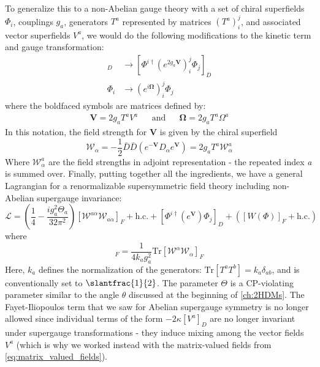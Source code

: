 To generalize this to a non-Abelian gauge theory with a set of chiral superfields $\Phi_i$, couplings $g_a$, generators $T^a$ represented by matrices $(T^a)_i^j$, and associated vector superfields $V^a$, we would do the following modifications to the kinetic term and gauge transformation:
\begin{align*}
  [\Phi^\dagger e^{2gqV}\Phi]_D&\rightarrow[\Phi^{i\dagger} (e^{2g_a\mathbf{V}})_i^j\Phi_j]_D\\
  \Phi_i&\rightarrow (e^{i\textbf{Ω}})_i^j\Phi_j
\end{align*}
where the boldfaced symbols are matrices defined by:
\begin{align}
  \mathbf{V} = 2g_aT^aV^a&&\text{and}&& \textbf{Ω} = 2g_aT^a\Omega^a
  \label{eq:matrix_valued_fields}
\end{align}
In this notation, the field strength for \textbf{V} is given by the chiral superfield
\[\mathcal{W}_\alpha = -\frac{1}{2}\bar{D}\bar{D}\left(e^{-\mathbf{V}}D_\alpha e^{\mathbf{V}}\right) = 2g_aT^a\mathcal{W}^a_\alpha\]
Where $\mathcal{W}_\alpha^a$ are the field strengths in adjoint representation - the repeated index \emph{a} is summed over. Finally, putting together all the ingredients, we have a general Lagrangian for a renormalizable supersymmetric field theory including non-Abelian supergauge invariance:
\begin{equation*}
  \mathcal{L} = \left(\frac{1}{4}-\frac{ig_a^2\Theta_a}{32\pi^2}\right)[\mathcal{W}^{a\alpha}\mathcal{W}_{a\alpha}]_F + \text{h.c.} + \left[\Phi^{i\dagger}(e^{\mathbf{V}})\Phi_j\right]_D + \left([W(\Phi)]_F + \text{h.c.}\right)
\end{equation*}
where 
\begin{equation*}
  [\mathcal{W}^{a\alpha}\mathcal{W}_{a\alpha}]_F = \frac{1}{4k_ag_a^2}\text{Tr}[\mathcal{W}^\alpha\mathcal{W}_\alpha]_F
\end{equation*}
Here, $k_a$ defines the normalization of the generators: $\text{Tr}[T^aT^b] = k_a\delta_{ab}$, and is conventionally set to $\slantfrac{1}{2}$. The parameter $\Theta$ is a CP-violating parameter similar to the angle $\theta$ discussed at the beginning of \autoref{ch:2HDMs}. The Fayet-Iliopoulos term that we saw for Abelian supergauge symmetry is no longer allowed since individual terms of the form $-2\kappa[V^a]_D$ are no longer invariant under supergauge transformations - they induce mixing among the vector fields $V^a$ (which is why we worked instead with the matrix-valued fields from \eqref{eq:matrix_valued_fields}).

